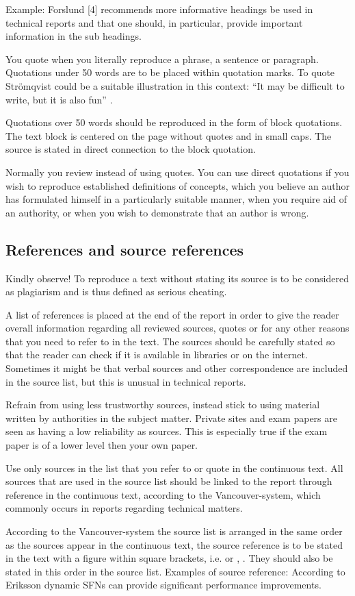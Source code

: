 Example: Forslund [4] recommends more informative headings be used in technical reports and that one should, in particular, provide important information in the sub headings.

You quote when you literally reproduce a phrase, a sentence or paragraph. Quotations under 50 words are to be placed within quotation marks. To quote Strömqvist could be a suitable illustration in this context: “It may be difficult to write, but it is also fun” \cite{stomquist}.

Quotations over 50 words should be reproduced in the form of block quotations. The text block is centered on the page without quotes and in small caps. The source is stated in direct connection to the block quotation.

Normally you review instead of using quotes. You can use direct quotations if you wish to reproduce established definitions of concepts, which you believe an author has formulated himself in a particularly suitable manner, when you require aid of an authority, or when you wish to demonstrate that an author is wrong.

\subsection{References and source references}
Kindly observe! To reproduce a text without stating its source is to be considered as plagiarism and is thus defined as serious cheating.

A list of references is placed at the end of the report in order to give the reader overall information regarding all reviewed sources, quotes or for any other reasons that you need to refer to in the text. The sources should be carefully stated so that the reader can check if it is available in libraries or on the internet. Sometimes it might be that verbal sources and other correspondence are included in the source list, but this is unusual in technical reports.

Refrain from using less trustworthy sources, instead stick to using material written by authorities in the subject matter. Private sites and exam papers are seen as having a low reliability as sources. This is especially true if the exam paper is of a lower level then your own paper.

Use only sources in the list that you refer to or quote in the continuous text. All sources that are used in the source list should be linked to the report through reference in the continuous text, according to the Vancouver-system, which commonly occurs in reports regarding technical matters.

According to the Vancouver-system the source list is arranged in the same order as the sources appear in the continuous text, the source reference is to be stated in the text with a figure within square brackets, i.e. \cite{dataterm-kth} or \cite{eriksson-2001}, \cite{stomquist}. They should also be stated in this order in the source list. Examples of source reference: According to Eriksson \cite{eriksson-2001}  dynamic SFNs can provide significant performance improvements.
\fi

